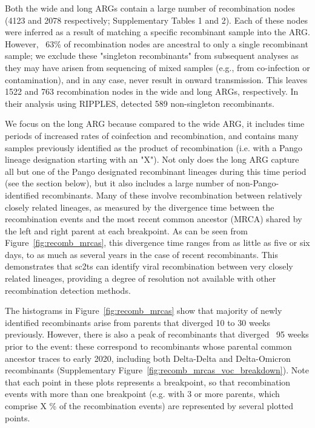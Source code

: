 \documentclass{article}
\begin{document}
Both the wide and long ARGs contain a large number of recombination nodes (4123 and 2078 respectively; Supplementary Tables 1 and 2). Each of these nodes were inferred as a result of matching a specific recombinant sample into the ARG. However, ~63\% of recombination nodes are ancestral to only a single recombinant sample; we exclude these "singleton recombinants" from subsequent analyses as they may have arisen from sequencing of mixed samples (e.g., from co-infection or contamination), and in any case, never result in onward transmission.  This leaves 1522 and 763 recombination nodes in the wide and long ARGs, respectively. In their analysis using RIPPLES, \cite{Turakhia2022-it} detected 589 non-singleton recombinants.

We focus on the long ARG because compared to the wide ARG, it includes time periods of increased rates of coinfection and recombination, and contains many samples previously identified as the product of recombination (i.e. with a Pango lineage designation starting with an "X"). Not only does the long ARG capture all but one of the Pango designated recombinant lineages during this time period (see the section below), but it also includes a large number of non-Pango-identified recombinants. Many of these involve recombination between relatively closely related lineages, as measured by the divergence time between the recombination events and the most recent common ancestor (MRCA) shared by  the left and right parent at each breakpoint. As can be seen from Figure~\ref{fig:recomb_mrcas}, this divergence time ranges from as little as five or six days, to as much as several years in the case of recent recombinants. This demonstrates that sc2ts can identify viral recombination between very closely related lineages, providing a degree of resolution not available with other recombination detection methods.

The histograms in Figure~\ref{fig:recomb_mrcas} show that
majority of newly identified recombinants arise from parents that diverged 10 to 30 weeks previously. However, there is also a peak of recombinants that diverged ~95 weeks prior to the event: these correspond to recombinants whose parental common ancestor traces to early 2020, including both Delta-Delta and Delta-Omicron recombinants (Supplementary Figure~\ref{fig:recomb_mrcas_voc_breakdown}). Note that each point in these plots represents a breakpoint, so that recombination events with more than one breakpoint (e.g. with 3 or more parents, which comprise X \% of the recombination events) are represented by several plotted points.
\end{document}
